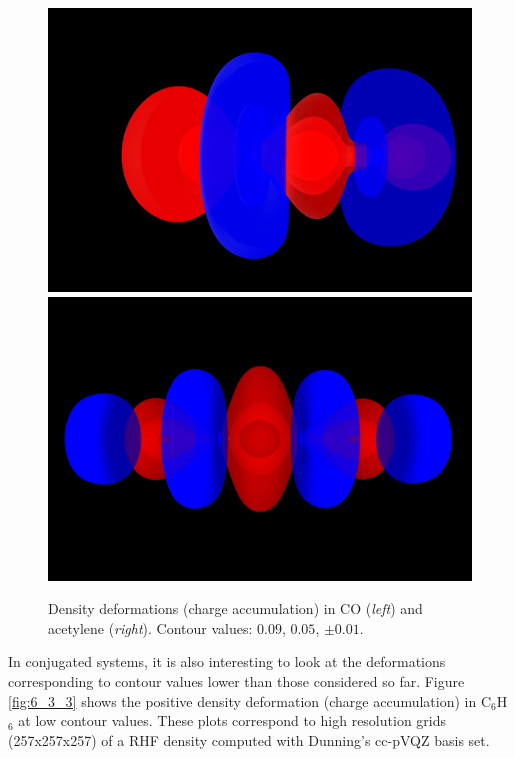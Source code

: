 \documentclass[10pt]{article}
\begin{document}
\begin{figure}[H]
\begin{center}
\includegraphics[width=.4\linewidth]{CO-def-b.png}
\hspace*{5mm}
\includegraphics[width=.4\linewidth]{C2H2-def-b.png}
\end{center}
\caption[Charge accumulation in CO]{ Density deformations (charge accumulation) in CO ({\it left}) and
acetylene ({\it right}). Contour values: $0.09$, $0.05$, $\pm 0.01$.
\label{fig:6_3_2}}
\end{figure}

In conjugated systems, it is also interesting to look at the deformations
corresponding to contour values lower than those considered so far. Figure
\ref{fig:6_3_3} shows the positive density deformation (charge accumulation) in
C$_6$H$_6$ at low contour values. These plots correspond to high resolution
grids (257x257x257) of a RHF density computed with Dunning's cc-pVQZ basis
set.
\end{document}
